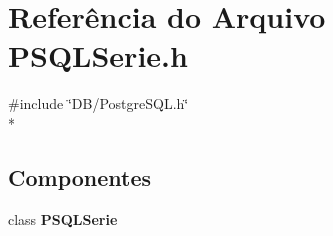 \section{Referência do Arquivo P\+S\+Q\+L\+Serie.\+h}
\label{_p_s_q_l_serie_8h}
{\ttfamily \#include \char`\"{}D\+B/\+Postgre\+S\+Q\+L.\+h\char`\"{}}\\*
\subsection*{Componentes}
\begin{DoxyCompactItemize}
\item 
class {\bf P\+S\+Q\+L\+Serie}
\end{DoxyCompactItemize}
